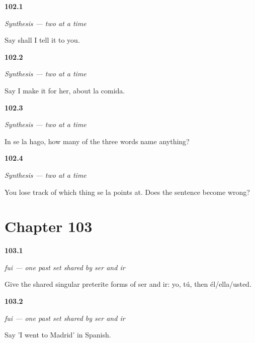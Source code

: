 \noindent\begin{minipage}[t]{\linewidth}
\raggedright
\hypertarget{review-ES-C47-sintesis-dos-a-la-vez-you}{\textbf{102.1}} \emph{Synthesis — two at a time}\par
\small Say shall I tell it to you.
\end{minipage}\par\medskip

\noindent\begin{minipage}[t]{\linewidth}
\raggedright
\hypertarget{review-ES-C47-sintesis-dos-a-la-vez-her}{\textbf{102.2}} \emph{Synthesis — two at a time}\par
\small Say I make it for her, about la comida.
\end{minipage}\par\medskip

\noindent\begin{minipage}[t]{\linewidth}
\raggedright
\hypertarget{review-ES-C47-sintesis-dos-a-la-vez-count}{\textbf{102.3}} \emph{Synthesis — two at a time}\par
\small In se la hago, how many of the three words name anything?
\end{minipage}\par\medskip

\noindent\begin{minipage}[t]{\linewidth}
\raggedright
\hypertarget{review-ES-C47-sintesis-dos-a-la-vez-cost}{\textbf{102.4}} \emph{Synthesis — two at a time}\par
\small You lose track of which thing se la points at. Does the sentence become wrong?
\end{minipage}\par\medskip

\section*{Chapter 103}

\noindent\begin{minipage}[t]{\linewidth}
\raggedright
\hypertarget{review-ES-C14-ser-ir-preterite-singular-forms}{\textbf{103.1}} \emph{fui — one past set shared by ser and ir}\par
\small Give the shared singular preterite forms of ser and ir: yo, tú, then él/ella/usted.
\end{minipage}\par\medskip

\noindent\begin{minipage}[t]{\linewidth}
\raggedright
\hypertarget{review-ES-C14-ser-ir-preterite-fui-madrid}{\textbf{103.2}} \emph{fui — one past set shared by ser and ir}\par
\small Say 'I went to Madrid' in Spanish.
\end{minipage}\par\medskip

